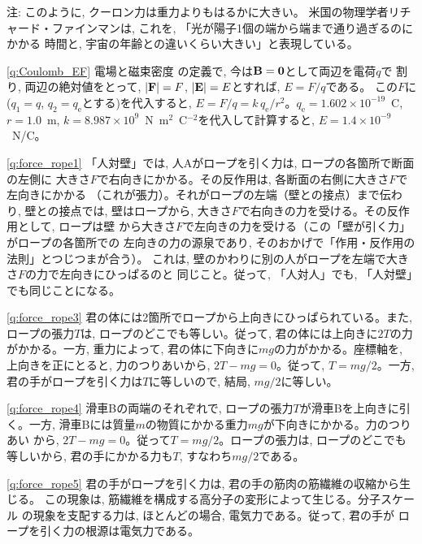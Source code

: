 {\small
注: このように, クーロン力は重力よりもはるかに大きい。
米国の物理学者リチャード・ファインマンは, 
これを, 「光が陽子1個の端から端まで通り過ぎるのにかかる
時間と, 宇宙の年齢との違いくらい大きい」と表現している。}
\vspace{0.2cm}

\ref{q:Coulomb_EF} 電場と磁束密度
の定義で, 今は${\bf B}={\bf 0}$として両辺を電荷$q$で
割り, 両辺の絶対値をとって, $|{\bf F}|=F$, $|{\bf E}|=E$とすれば, $E=F/q$である。
この$F$に($q_1=q$, $q_2=q_\text{e}$とする)を代入すると, 
$E=F/q=k\,q_{\text{e}}/r^2$。$q_{\text{e}}=1.602\times10^{-19}$~C, $r=1.0$~m, 
$k=8.987\times 10^{9}$~N~m$^2$~C$^{-2}$を代入して計算すると, $E=1.4\times 10^{-9}$~N/C。\mv

\ref{q:force_rope1} 
「人対壁」では, 人Aがロープを引く力は, ロープの各箇所で断面の左側に
大きさ$F$で右向きにかかる。その反作用は, 各断面の右側に大きさ$F$で左向きにかかる
（これが張力）。それがロープの左端（壁との接点）まで伝わり, 壁との接点では, 
壁はロープから, 大きさ$F$で右向きの力を受ける。その反作用として, ロープは壁
から大きさ$F$で左向きの力を受ける（この「壁が引く力」がロープの各箇所での
左向きの力の源泉であり, そのおかげで「作用・反作用の法則」とつじつまが合う）。
これは, 壁のかわりに別の人がロープを左端で大きさ$F$の力で左向きにひっぱるのと
同じこと。従って, 「人対人」でも, 「人対壁」でも同じことになる。
\vspace{0.2cm}

%
\ref{q:force_rope3} 
君の体には2箇所でロープから上向きにひっぱられている。また, ロープの張力$T$は, 
ロープのどこでも等しい。従って, 君の体には上向きに$2T$の力がかかる。一方, 
重力によって, 君の体に下向きに$mg$の力がかかる。座標軸を, 上向きを正にとると, 力のつりあいから, 
$2T-mg=0$。従って, $T=mg/2$。一方, 君の手がロープを引く力は$T$に等しいので, 
結局, $mg/2$に等しい。
\mv

%
\ref{q:force_rope4} 
滑車Bの両端のそれぞれで, ロープの張力$T$が滑車Bを上向きに引く。一方, 
滑車Bには質量$m$の物質にかかる重力$mg$が下向きにかかる。力のつりあい
から, $2T-mg=0$。従って$T=mg/2$。ロープの張力は, ロープのどこでも
等しいから, 君の手にかかる力も$T$, すなわち$mg/2$である。
\vspace{0.2cm}

%
\ref{q:force_rope5} 
君の手がロープを引く力は, 君の手の筋肉の筋繊維の収縮から生じる。
この現象は, 筋繊維を構成する高分子の変形によって生じる。分子スケール
の現象を支配する力は, ほとんどの場合, 電気力である。従って, 君の手が
ロープを引く力の根源は電気力である。
\vspace{0.2cm}

